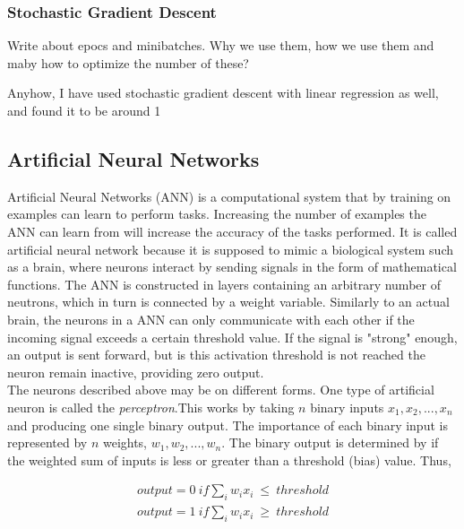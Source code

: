 \documentclass[a4paper,11pt,twocolumn]{article}
\begin{document}
\subsubsection{Stochastic Gradient Descent}

Write about epocs and minibatches. Why we use them, how we use them and maby how to optimize the number of these? 

Anyhow, I have used stochastic gradient descent with linear regression as well, and found it to be around 1%

\subsection{Artificial Neural Networks}

Artificial Neural Networks (ANN) is a computational system that by training on examples can learn to perform tasks. Increasing the number of examples the ANN can learn from will increase the accuracy of the tasks performed. It is called artificial neural network because it is supposed to mimic a biological system such as a brain, where neurons interact by sending signals in the form of mathematical functions. The ANN is constructed in layers containing an arbitrary number of neutrons, which in turn is connected by a weight variable. Similarly to an actual brain, the neurons in a ANN can only communicate with each other if the incoming signal exceeds a certain threshold value. If the signal is "strong" enough, an output is sent forward, but is this activation threshold is not reached the neuron remain inactive, providing zero output\cite{slides}. 
\\

The neurons described above may be on different forms. One type of artificial neuron is called the \textit{perceptron}.This works by taking $n$ binary inputs $x_1,x_2,...,x_n$ and producing one single binary output. The importance of each binary input is represented by $n$ weights, $w_1,w_2,...,w_n$. The binary output is determined by if the weighted sum of inputs is less or greater than a threshold (bias) value. Thus,

\begin{equation*}
\begin{aligned}
output = 0 \ if \sum_i w_ix_i \ \leq \ threshold \\
output = 1 \ if \sum_i w_ix_i \ \geq \ threshold
\end{aligned}
\end{equation*}
\end{document}
